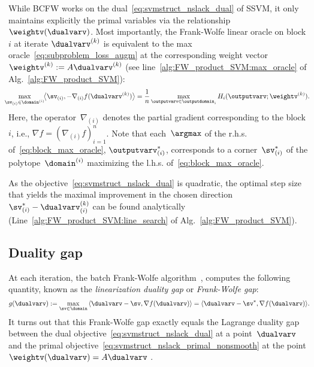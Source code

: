 \documentclass{article}
\begin{document}
While BCFW works on the dual~\eqref{eq:svmstruct_nslack_dual} of SSVM, it only maintains explicitly the primal variables via the relationship $\weightv(\dualvarv)$. 
Most importantly, the Frank-Wolfe linear oracle on block $i$ at iterate $\dualvarv^{(k)}$ is equivalent to the max oracle~\eqref{eq:subproblem_loss_augm} at the corresponding weight vector $\weightv^{(k)}:= A\dualvarv^{(k)}$ \citep[App.~B.1]{lacosteJulien13bcfw} (see line~\ref{alg:FW_product_SVM:max_oracle} of Alg.~\ref{alg:FW_product_SVM}):
%
\begin{equation}
\label{eq:block_max_oracle}
\!\!\!\!\displaystyle\max_{\sv_{(i)}\in \domain^{(i)}} \!\!\big\langle \sv_{(i)}, -\nabla_{(i)} f(\dualvarv^{(k)}) \big\rangle
=
\frac1n\max_{\outputvarv\in\outputdomain_i} H_i(\outputvarv;\weightv^{(k)}).
\end{equation}
Here, the operator~$\nabla_{(i)}$ denotes the partial gradient corresponding to the block~$i$, i.e., $\nabla f = (\nabla_{(i)} f)_{i=1}^n$. Note that each~$\argmax$ of the r.h.s. of~\eqref{eq:block_max_oracle}, $\outputvarv_{(i)}^*$, corresponds to a corner~$\sv_{(i)}^*$ of the polytope~$\domain^{(i)}$ maximizing the l.h.s. of~\eqref{eq:block_max_oracle}.

As the objective~\eqref{eq:svmstruct_nslack_dual} is quadratic, the optimal step size that yields the maximal improvement in the chosen direction $\sv_{(i)}^*- \dualvarv^{(k)}_{(i)}$ can be found analytically (Line~\ref{alg:FW_product_SVM:line_search} of Alg.~\ref{alg:FW_product_SVM}).

%
%
%
%
%
%
%
%
%

%
%
%
%
%
%
%
%
%
%
%
%
%
%
%
%

\subsection{Duality gap \label{sec:duality_gap}}
At each iteration, the batch Frank-Wolfe algorithm~\citep{Frank:1956vp}, \citep[Section~3]{lacosteJulien13bcfw} computes the following quantity, known as the \emph{linearization duality gap} or \emph{Frank-Wolfe gap}:
\begin{equation}\label{eq:duality_gap}
  g(\dualvarv) := \max_{\sv \in \domain} \,\langle \dualvarv - \sv, \nabla f(\dualvarv) \rangle
  = \langle \dualvarv - \sv^*, \nabla f(\dualvarv) \rangle .
\end{equation}
It turns out that this Frank-Wolfe gap exactly equals the Lagrange duality gap between the dual objective~\eqref{eq:svmstruct_nslack_dual} at a point~$\dualvarv$ and the primal objective~\eqref{eq:svmstruct_nslack_primal_nonsmooth} at the point~$\weightv(\dualvarv)=A\dualvarv$ \citep[App.~B.2]{lacosteJulien13bcfw}.
\end{document}
